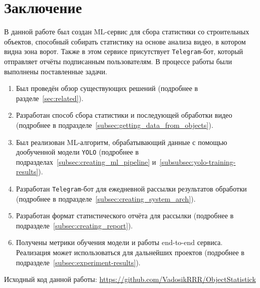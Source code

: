 
\section*{Заключение}

В данной работе был создан ML-сервис для сбора статистики со строительных объектов,
способный собирать статистику на основе анализа видео, в котором видна зона ворот.
Также в этом сервисе присутствует \texttt{Telegram}-бот, который отправляет отчёты подписанным пользователям.
В процессе работы были выполнены поставленные задачи.

\begin{enumerate}
    \item Был проведён обзор существующих решений (подробнее в разделе~\ref{sec:related}).
    \item Разработан способ сбора статистики и последующей обработки видео (подробнее в подразделе~\ref{subsec:getting_data_from_objects}).
    \item Был реализован ML-алгоритм, обрабатывающий данные с помощью дообученной модели \texttt{YOLO} (подробнее в подразделах~\ref{subsec:creating_ml_pipeline} и~\ref{subsubsec:yolo-training-results}).
    \item Разработан \texttt{Telegram}-бот для ежедневной рассылки результатов обработки (подробнее в подразделе~\ref{subsec:creating_system_arch}).
    \item Разработан формат статистического отчёта для рассылки (подробнее в подразделе~\ref{subsec:creating_report}).
    \item Получены метрики обучения модели и работы end-to-end сервиса. Реализация может использоваться для дальнейших проектов (подробнее в подразделе~\ref{subsec:experiment-results}).
\end{enumerate}

Исходный код данной работы: \url{https://github.com/VadosikRRR/ObjectStatistick}
